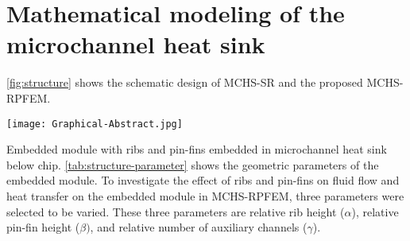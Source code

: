 %
% 
%

\section{Mathematical modeling of the microchannel heat sink}

\cref{fig:structure} shows the schematic design of MCHS-SR and the proposed MCHS-RPFEM.


\begin{figure*}[htbp] %
    \centering %
    \scriptsize %
    \texttt{[image: Graphical-Abstract.jpg]} %
    \caption{
        (a) Straight rectangular microchannel (MCHS-SR),
        (b) microchannel heat sink with embedded modules with ribs and pin-fins (MCHS-RPFEM),
        (c) schematic diagram of the structure of MCHS-RPFEM.}
    \label{fig:structure}
\end{figure*}
Embedded module with ribs and pin-fins embedded in microchannel heat sink below chip.
\cref{tab:structure-parameter} shows the geometric parameters of the embedded module.
To investigate the effect of ribs and pin-fins on fluid flow and heat transfer on the embedded module in MCHS-RPFEM, three parameters were selected to be varied.
These three parameters are relative rib height ($\alpha$), relative pin-fin height ($\beta)$, and relative number of auxiliary channels ($\gamma$).


